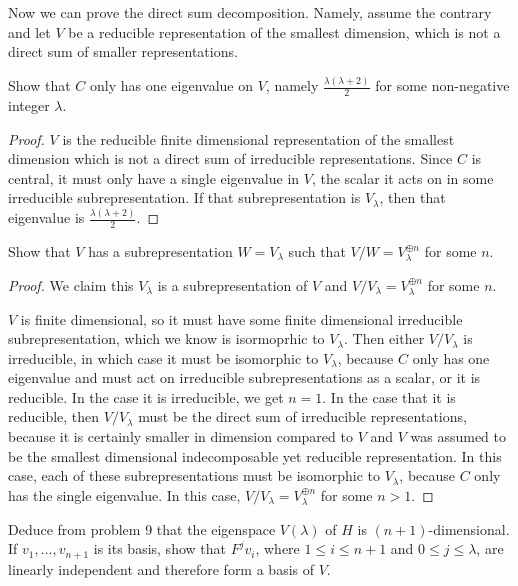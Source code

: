 \documentclass{article}
\begin{document}
Now we can prove the direct sum decomposition. Namely, assume the contrary and
let $V$ be a reducible representation of the smallest dimension, which is not a
direct sum of smaller representations.

\begin{prop}
Show that $C$ only has one eigenvalue on $V$, namely $\frac{\lambda (\lambda +
2)}{2}$ for some non-negative integer $\lambda$.
\end{prop}

\begin{proof}
$V$ is the reducible finite dimensional representation of the smallest dimension
which is not a direct sum of irreducible representations. Since $C$ is central,
it must only have a single eigenvalue in $V$, the scalar it acts on in some
irreducible subrepresentation. If that subrepresentation is $V_{\lambda}$, then
that eigenvalue is $\frac{\lambda (\lambda + 2)}{2}$.
\end{proof}

\begin{prop}
Show that $V$ has a subrepresentation $W = V_{\lambda}$ such that $V / W =
V_{\lambda}^{\oplus n}$ for some $n$.
\end{prop}

\begin{proof}
We claim this $V_{\lambda}$ is a subrepresentation of $V$ and $V / V_{\lambda} =
V_{\lambda}^{\oplus n}$ for some $n$.

$V$ is finite dimensional, so it must have some finite dimensional irreducible
subrepresentation, which we know is isormoprhic to $V_{\lambda}$. Then either $V
/ V_{\lambda}$ is irreducible, in which case it must be isomorphic to
$V_{\lambda}$, because $C$ only has one eigenvalue and must act on irreducible
subrepresentations as a scalar, or it is reducible. In the case it is
irreducible, we get $n = 1$. In the case that it is reducible, then $V /
V_{\lambda}$ must be the direct sum of irreducible representations, because it
is certainly smaller in dimension compared to $V$ and $V$ was assumed to be the
smallest dimensional indecomposable yet reducible representation. In this case,
each of these subrepresentations must be isomorphic to $V_{\lambda}$, because
$C$ only has the single eigenvalue. In this case, $V / V_{\lambda} =
V_{\lambda}^{\oplus n}$ for some $n > 1$.
\end{proof}

\begin{prop}
Deduce from problem 9 that the eigenspace $V(\lambda)$ of $H$ is $(n +
1)$-dimensional. If $v_1, \dots, v_{n + 1}$ is its basis, show that $F^j v_i$,
where $1 \leq i \leq n + 1$ and $0 \leq j \leq \lambda$, are linearly
independent and therefore form a basis of $V$.
\end{prop}
\end{document}
